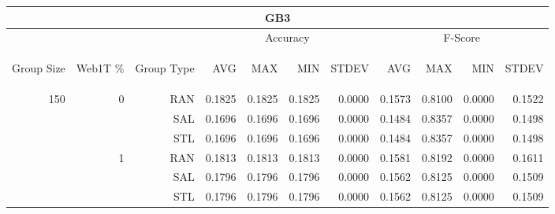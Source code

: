 \begin{center}
\begin{table}[htbp] 
 \begin{center}
\begin{tabular}{ | r | r | r | r | r | r | r | r | r | r | r |}
\hline
\multicolumn{11}{|c|}{GB3}\\
\hline
 & & & \multicolumn{4}{|c|}{Accuracy} & \multicolumn{4}{|c|}{F-Score}\\ \cline{4-11}
\begin{sideways}Group Size\end{sideways} & \begin{sideways}Web1T \%\end{sideways} & \begin{sideways}Group Type\end{sideways} & \begin{sideways}AVG\end{sideways} & \begin{sideways}MAX\end{sideways} & \begin{sideways}MIN\end{sideways} & \begin{sideways}STDEV\end{sideways} & \begin{sideways}AVG\end{sideways} & \begin{sideways}MAX\end{sideways} & \begin{sideways}MIN\end{sideways} & \begin{sideways}STDEV\end{sideways}\\
\hline
\multirow{9}{*}{150}
 & \multirow{3}{*}{0} & RAN & 0.1825 & 0.1825 & 0.1825 & 0.0000 & 0.1573 & 0.8100 & 0.0000 & 0.1522\\ \cline{3-11}
 &   & SAL & 0.1696 & 0.1696 & 0.1696 & 0.0000 & 0.1484 & 0.8357 & 0.0000 & 0.1498\\ \cline{3-11}
 &   & STL & 0.1696 & 0.1696 & 0.1696 & 0.0000 & 0.1484 & 0.8357 & 0.0000 & 0.1498\\ \cline{2-11}
 & \multirow{3}{*}{1} & RAN & 0.1813 & 0.1813 & 0.1813 & 0.0000 & 0.1581 & 0.8192 & 0.0000 & 0.1611\\ \cline{3-11}
 &   & SAL & 0.1796 & 0.1796 & 0.1796 & 0.0000 & 0.1562 & 0.8125 & 0.0000 & 0.1509\\ \cline{3-11}
 &   & STL & 0.1796 & 0.1796 & 0.1796 & 0.0000 & 0.1562 & 0.8125 & 0.0000 & 0.1509\\ \cline{2-11}

\end{tabular}
\end{center}
\end{table}
\end{center}
